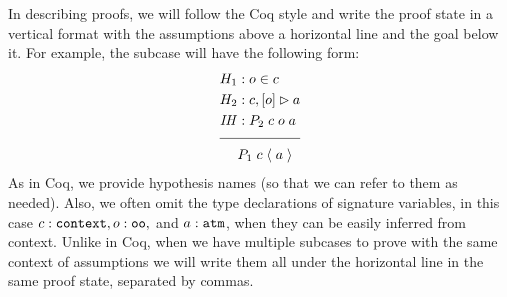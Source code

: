 In describing proofs, we will follow the Coq style and write the proof state in a vertical format with the assumptions above a horizontal line and the goal below it. For example, the \rlnmsinit{} subcase will have the following form:
\begin{align*}
H_1 &: o \in c \\
H_2 &: \bchsl[c]{o}{a} \\
\mathit{IH} &: P_2 \; c \; o \; a \\[\pfshift{}]
\cline{1-2}
&P_1 \; c \; \atom{a}
\end{align*}
As in Coq, we provide hypothesis names (so that we can refer to them as needed). Also, we often omit the type declarations of signature variables, in this case $c : \texttt{context}, o:\texttt{oo},$ and $a : \texttt{atm}$, when they can be easily inferred from context. Unlike in Coq, when we have multiple subcases to prove with the same context of assumptions we will write them all under the horizontal line in the same proof state, separated by commas.


